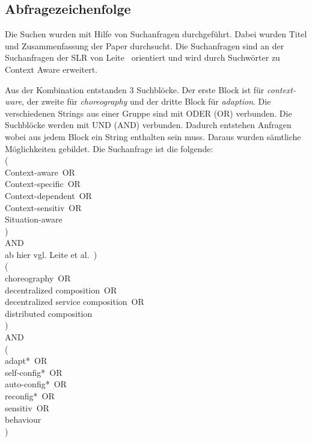 \documentclass[conference,compsoc]{IEEEtran}
\begin{document}
\subsection{Abfragezeichenfolge}
Die Suchen wurden mit Hilfe von Suchanfragen durchgeführt. Dabei wurden Titel und Zusammenfassung der Paper durchsucht.
Die Suchanfragen sind an der Suchanfragen der SLR von Leite~\cite{leite2013systematic} orientiert und wird durch Suchwörter zu Context Aware erweitert.

Aus der Kombination entstanden 3 Suchblöcke. Der erste Block ist für \textit{context-ware}, der zweite für \textit{choreography} und der dritte Block für \textit{adaption}. Die verschiedenen Strings aus einer Gruppe sind mit ODER (OR) verbunden. Die Suchblöcke werden mit UND (AND) verbunden. Dadurch entstehen Anfragen wobei aus jedem Block ein String enthalten sein muss. Daraus wurden sämtliche Möglichkeiten gebildet. 
Die Suchanfrage ist die folgende: \\

(\\
	\glqq Context-aware\grqq~OR\\
	\glqq Context-specific\grqq~OR\\
	\glqq Context-dependent\grqq~OR\\
	\glqq Context-sensitiv\grqq~OR\\
	\glqq Situation-aware\grqq \\
)\\
AND\\
ab hier vgl. Leite et al.~\cite{leite2013systematic}) \\
 (\\
\glqq choreography\grqq~OR\\
\glqq decentralized composition\grqq~OR\\
\glqq decentralized service composition\grqq~OR\\
\glqq distributed composition\grqq\\
) \\
AND\\
(\\
\glqq adapt*\grqq~OR\\
\glqq self-config*\grqq~OR\\
\glqq auto-config*\grqq~OR\\
\glqq reconfig*\grqq~OR\\
\glqq sensitiv\grqq~OR\\
\glqq behaviour\grqq\\
)\\
\end{document}

